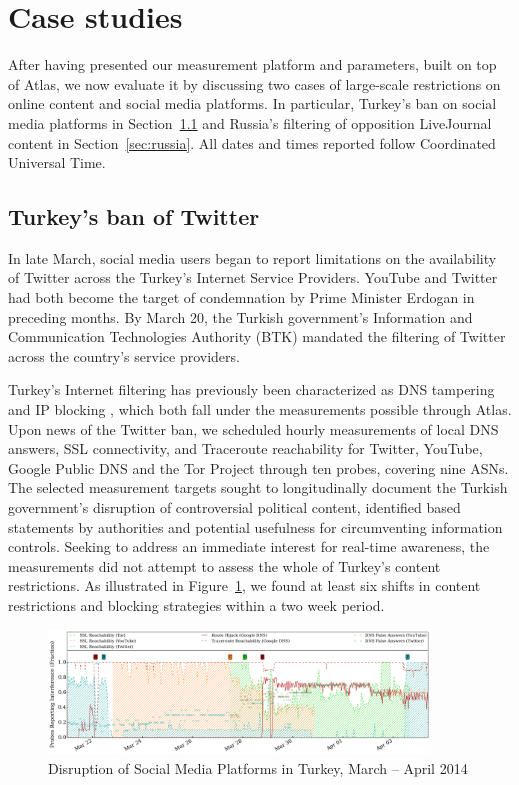 \section{Case studies}
\label{sec:case_studies}

After having presented our measurement platform and parameters, built on top of
Atlas, we now evaluate it by discussing two cases of large-scale
restrictions on online content and social media platforms.  In particular, Turkey's ban on social media platforms in
Section~\ref{sec:turkey} and Russia's filtering of opposition LiveJournal content in Section~\ref{sec:russia}. All dates and times reported follow Coordinated Universal Time.


\subsection{Turkey's ban of Twitter}
\label{sec:turkey}

In late March, social media users began to report limitations on the
availability of Twitter across the Turkey's Internet Service Providers.
YouTube and Twitter had both become the target of condemnation by Prime Minister
Erdogan in preceding months. By March 20, the Turkish government's Information
and Communication Technologies Authority (BTK) mandated the filtering of
Twitter across the country's service providers.

Turkey's Internet filtering has previously been characterized as DNS tampering and
IP blocking \cite{akdeniz2010report}, which both fall under the measurements
possible through Atlas.  Upon news of the Twitter ban, we
scheduled hourly measurements of local DNS answers, SSL connectivity, and
Traceroute reachability for Twitter, YouTube, Google Public DNS and the Tor
Project through ten probes, covering nine ASNs.  The selected measurement targets sought to longitudinally
document the Turkish government's disruption of controversial political
content, identified based statements by authorities and potential usefulness for
circumventing information controls. Seeking to address an immediate interest for real-time
awareness, the measurements did not attempt to assess the whole of Turkey's content
restrictions. As illustrated in Figure~\ref{image:tr-social_media_filtering}, we
found at least six shifts in content restrictions and blocking strategies
within a two week period.

\begin{figure}
  \centering
  \includegraphics[width=0.9\textwidth]{diagrams/tr-20140321-20140407-social_media_filtering.png}
  \caption{Disruption of Social Media Platforms in Turkey, March -- April 2014}
  \label{image:tr-social_media_filtering}
\end{figure}


